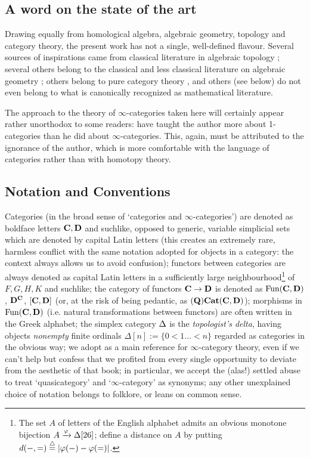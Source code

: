 \subsection*{A word on the state of the art}
Drawing equally from homological algebra, algebraic geometry, topology and category theory, the present work has not a single, well\hyp{}defined flavour. Several sources of inspirations came from classical literature in algebraic topology \cite{HPS,MR0246294,shc}; several others belong to the classical and less classical literature on algebraic geometry \cite{Verdier1996,Brid,Bridge2,Bondal1995}; others belong to pure category theory \cite{RT, CHK,JanelidzeMarkl,Korostenski199357,Lucyshyn-Wright,zangurashvili2004several}, and others (see below) do not even belong to what is canonically recognized as mathematical literature.

The approach to the theory of $\infty$\hyp{}categories taken here will certainly appear rather unorthodox to some readers: \cite{HTT,LurieHA} have taught the author more about 1\hyp{}categories than he did about $\infty$\hyp{}categories. This, again, must be attributed to the ignorance of the author, which is more comfortable with the language of categories rather than with homotopy theory.
\subsection*{Notation and Conventions}
Categories (in the broad sense of `categories and $\infty$\hyp{}categories') are denoted as boldface letters $\mathbf{C},\mathbf{D}$ and suchlike, opposed to generic, variable simplicial sets which are denoted by capital Latin letters (this creates an extremely rare, harmless conflict with the same notation adopted for objects in a category: the context always allows us to avoid confusion); functors between categories are always denoted as capital Latin letters in a sufficiently large neighbourhood\footnote{The set $A$ of letters of the English alphabet admits an obvious monotone bijection $A\xrightarrow{\varphi}\Delta[26]$; define a distance on $A$ by putting $d(-,=) \overset{\triangle}{=} |\varphi(-) - \varphi(=)|$.} of $F,G,H,K$ and suchlike; the category of functors $\mathbf{C}\to \mathbf{D}$ is denoted as $\text{Fun}(\mathbf{C},\mathbf{D})$, $\mathbf{D}^{\mathbf{C}}$, $[\mathbf{C},\mathbf{D}]$ (or, at the risk of being pedantic, as $\mathbf{(Q)Cat}(\mathbf{C}, \mathbf{D})$); morphisms in $\text{Fun}(\mathbf{C},\mathbf{D})$ (i.e. natural transformations between functors) are often written in the Greek alphabet; the simplex category $\Delta$ is the \emph{topologist's delta}, having objects \emph{nonempty} finite ordinals $\Delta[n]:=\{0<1\dots<n\}$ regarded as categories in the obvious way; we adopt \cite{HTT} as a main reference for $\infty$\hyp{}category theory, even if we can't help but confess that we profited from every single opportunity to deviate from the aesthetic of that book; in particular, we accept the (alas!) settled abuse to treat `quasicategory' and `$\infty$\hyp{}category' as synonyms; any other unexplained choice of notation belongs to folklore, or leans on common sense.

